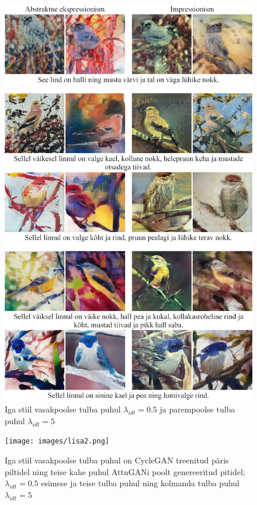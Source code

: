 \documentclass{vilgym}
\begin{document}
	\begin{figure}[H]
		\includegraphics[width=0.8\linewidth]{images/lisa1.png}
		\caption{Iga stiil vasakpoolse tulba puhul $ \lambda_{idt} = 0.5 $ ja parempoolse tulba puhul $ \lambda_{idt} = 5 $}
		\label{fig:lisa1}
	\end{figure}

	\begin{figure}[H]
		\texttt{[image: images/lisa2.png]}
		\caption{Iga stiil vasakpoolse tulba puhul on CycleGAN treenitud päris piltidel ning teise kahe puhul AttnGANi poolt genereeritud pitidel; $ \lambda_{idt} = 0.5 $ esimese ja teise tulba puhul ning kolmanda tulba puhul $ \lambda_{idt} = 5 $}
		\label{fig:lisa2}
	\end{figure}
\end{document}
